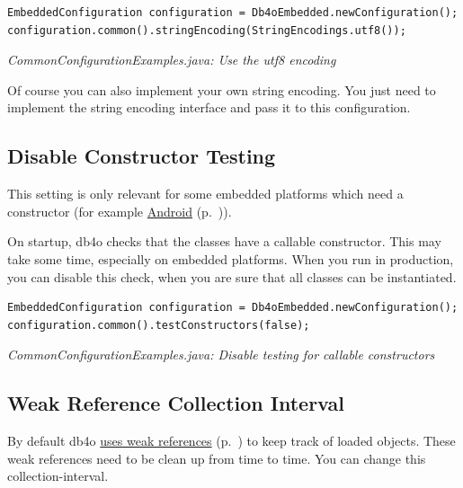 \begin{lstlisting}
EmbeddedConfiguration configuration = Db4oEmbedded.newConfiguration();
configuration.common().stringEncoding(StringEncodings.utf8());
\end{lstlisting}

{\small\itshape CommonConfigurationExamples.java: Use the utf8 encoding\par}
\medskip

Of course you can also implement your own string encoding. You just need to implement the string encoding interface and pass it to this configuration.

\subsection{Disable Constructor Testing}
\label{ref:configuration-common-no-test-instances}

This setting is only relevant for some embedded platforms which need a constructor (for example \hyperref[ref:platform-specific-issues-android]{Android} (p.~\pageref{ref:platform-specific-issues-android})).

On startup, db4o checks that the classes have a callable constructor. This may take some time, especially on embedded platforms. When you run in production, you can disable this check, when you are sure that all classes can be instantiated.\newline{}

\begin{lstlisting}
EmbeddedConfiguration configuration = Db4oEmbedded.newConfiguration();
configuration.common().testConstructors(false);
\end{lstlisting}

{\small\itshape CommonConfigurationExamples.java: Disable testing for callable constructors\par}
\medskip

\subsection{Weak Reference Collection Interval}
\label{ref:configuration-common-weak-reference-collection-interval}

By default db4o \hyperref[ref:basics-indentity-concept-reference-cache]{uses weak references} (p.~\pageref{ref:basics-indentity-concept-reference-cache}) to keep track of loaded objects. These weak references need to be clean up from time to time. You can change this collection-interval.

